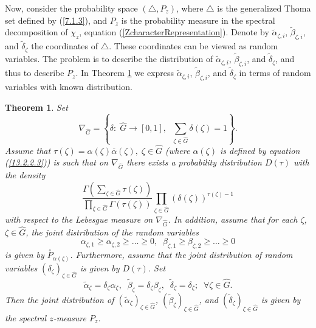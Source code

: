 \documentclass[12pt]{amsart}
\newtheorem{thm}{Theorem}[section]
\theoremstyle{definition}
\numberwithin{equation}{section}
\begin{document}
Now, consider the probability space $(\triangle, P_z)$, where $\triangle$ is the generalized Thoma set defined by (\ref{7.1.3}), and $P_z$ is the probability measure
in the spectral decomposition of $\chi_z$, equation (\ref{ZcharacterRepresentation}).
Denote by $\tilde{\alpha}_{\zeta,i}$, $\tilde{\beta}_{\zeta,i}$, and $\tilde{\delta}_{\zeta}$ the coordinates of $\triangle$. These coordinates can be
viewed as random variables. The problem is to describe the distribution of $\tilde{\alpha}_{\zeta,i}$, $\tilde{\beta}_{\zeta,i}$, and $\tilde{\delta}_{\zeta}$,
and thus to describe $P_z$. In Theorem \ref{THEOREMSPECTRAL} we express
$\tilde{\alpha}_{\zeta,i}$, $\tilde{\beta}_{\zeta,i}$, and $\tilde{\delta}_{\zeta}$
in terms of random variables with known distribution.
\begin{thm}\label{THEOREMSPECTRAL}
Set
\begin{equation}
\nabla_{\widehat{G}}=\left\{\delta:\;\widehat{G}\longrightarrow [0,1],\;\;\sum\limits_{\zeta\in\widehat{G}}\delta(\zeta)=1\right\}.
\end{equation}
Assume that $\tau(\zeta)=\alpha(\zeta)\overline{\alpha}(\zeta),\;\zeta\in \widehat{G}$  (where $\alpha(\zeta)$ is defined by equation (\ref{13.2.2.3})) is such that on $\nabla_{\widehat{G}}$  there exists a probability distribution $D(\tau)$ with the density
$$
\frac{\Gamma(\sum\limits_{\zeta\in\widehat{G}}\tau(\zeta))}{\prod\limits_{\zeta\in\widehat{G}}\Gamma(\tau(\zeta))}
\prod\limits_{\zeta\in\widehat{G}}\left(\delta(\zeta)\right)^{\tau(\zeta)-1}
$$
with respect to the Lebesgue measure on $\nabla_{\widehat{G}}$.
In addition, assume that for each $\zeta$, $\zeta\in\widehat{G}$, the joint distribution of the random variables
$$
\alpha_{\zeta,1}\geq\alpha_{\zeta,2}\geq\ldots\geq 0,\;\;\beta_{\zeta,1}\geq\beta_{\zeta,2}\geq\ldots\geq 0
$$
is given by $\overset{\circ}{P}_{\alpha(\zeta)}$. Furthermore, assume that the joint distribution of
random variables $\left(\delta_\zeta\right)_{\zeta\in\widehat{G}}$ is given by $D(\tau)$.
Set
$$
\tilde{\alpha}_{\zeta}=\delta_{\zeta}\alpha_{\zeta},\;\;\tilde{\beta}_{\zeta}=\delta_{\zeta}\beta_{\zeta},\;\;\tilde{\delta}_{\zeta}=
\delta_{\zeta};\;\;\forall\zeta\in\widehat{G}.
$$
Then the joint distribution  of $(\tilde{\alpha}_{\zeta})_{\zeta\in\widehat{G}}$, $(\tilde{\beta}_{\zeta})_{\zeta\in\widehat{G}}$,
and $(\tilde{\delta}_{\zeta})_{\zeta\in\widehat{G}}$ is given by the spectral $z$-measure $P_z$.
\end{thm}
\end{document}
